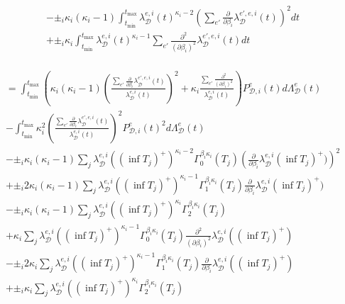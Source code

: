 \documentclass[honours,12pt]{unswthesis}
\numberwithin{equation}{section}
\begin{document}
\begin{equation*}
\begin{align}
		&- \pm_i\kappa_i(\kappa_i-1) \int_{t_\mathrm{min}}^{t_\mathrm{max}} \lambda_\mathcal{D}^{e,i}(t)^{\kappa_i-2} \left(\sum_{e'} \frac{\partial}{\partial\beta_i}\lambda_\mathcal{D}^{e',e,i}(t)\right)^2 dt \\
		&+ \pm_i\kappa_i \int_{t_\mathrm{min}}^{t_\mathrm{max}} \lambda_\mathcal{D}^{e,i}(t)^{\kappa_i-1} \sum_{e'} \frac{\partial^2}{(\partial\beta_i)^2}\lambda_\mathcal{D}^{e',e,i}(t) dt \\
	\end{align}
\end{equation*}

\begin{equation*}
	\begin{align}
		&= \int_{t_\mathrm{min}}^{t_\mathrm{max}} \left( \kappa_i(\kappa_i-1)\left(\frac{\sum_{e'}\frac{\partial}{\partial\beta_i}\lambda_\mathcal{D}^{e',e,i}(t)}{\lambda_\mathcal{D}^{e,i}(t)}\right)^2 + \kappa_i \frac{\sum_{e'}\frac{\partial^2}{(\partial\beta_i)^2}}{\lambda_\mathcal{D}^{e,i}(t)} \right) P_{\mathcal{D},i}^e(t) d\Lambda_\mathcal{D}^e(t) \\
		&- \int_{t_\mathrm{min}}^{t_\mathrm{max}} \kappa_i^2\left(\frac{\sum_{e'}\frac{\partial}{\partial\beta_i}\lambda_\mathcal{D}^{e',e,i}(t)}{\lambda_\mathcal{D}^{e,i}(t)}\right)^2 P_{\mathcal{D},i}^e(t)^2 d\Lambda_\mathcal{D}^e(t) \\
		&- \pm_i\kappa_i(\kappa_i-1) \sum_j \lambda_\mathcal{D}^{e,i}((\inf T_j)^+)^{\kappa_i-2} \Gamma_0^{\beta_i\kappa_i}(T_j) \left(\frac{\partial}{\partial\beta_i}\lambda_\mathcal{D}^{e,i}(\inf T_j)^+)\right)^2 \\
		&+ \pm_i2\kappa_i(\kappa_i-1) \sum_j \lambda_\mathcal{D}^{e,i}((\inf T_j)^+)^{\kappa_i-1} \Gamma_1^{\beta_i\kappa_i}(T_j) \frac{\partial}{\partial\beta_i}\lambda_\mathcal{D}^{e,i}(\inf T_j)^+) \\
		&- \pm_i\kappa_i(\kappa_i-1) \sum_j \lambda_\mathcal{D}^{e,i}((\inf T_j)^+)^{\kappa_i} \Gamma_2^{\beta_i\kappa_i}(T_j) \\
		&+ \kappa_i \sum_j \lambda_\mathcal{D}^{e,i}((\inf T_j)^+)^{\kappa_i-1} \Gamma_0^{\beta_i\kappa_i}(T_j) \frac{\partial^2}{(\partial\beta_i)^2}\lambda_\mathcal{D}^{e,i}((\inf T_j)^+) \\
		&-\pm_i2\kappa_i \sum_j \lambda_\mathcal{D}^{e,i}((\inf T_j)^+)^{\kappa_i-1} \Gamma_1^{\beta_i\kappa_i}(T_j)\frac{\partial}{\partial\beta_i}\lambda_\mathcal{D}^{e,i}((\inf T_j)^+) \\
		&+ \pm_i\kappa_i \sum_j \lambda_\mathcal{D}^{e,i}((\inf T_j)^+)^{\kappa_i} \Gamma_2^{\beta_i\kappa_i}(T_j)\\

\end{align}
\end{equation*}
\end{document}
